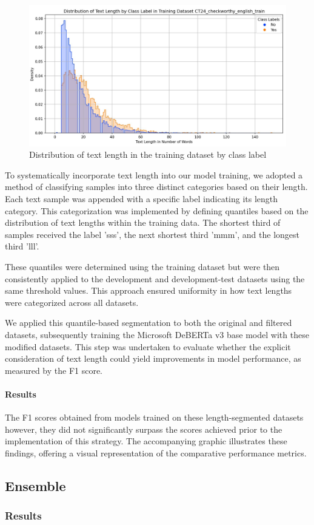 \begin{figure}[h]
    \centering
    \includegraphics[width=1\textwidth]{assets/Text_Length.jpg}
    \caption{Distribution of text length in the training dataset by class label}
    \label{fig:my_label}
\end{figure}
To systematically incorporate text length into our model training, we adopted a method of classifying samples into three distinct categories based on their length. Each text sample was appended with a specific label indicating its length category. This categorization was implemented by defining quantiles based on the distribution of text lengths within the training data. The shortest third of samples received the label 'sss', the next shortest third 'mmm', and the longest third 'lll'.

These quantiles were determined using the training dataset but were then consistently applied to the development and development-test datasets using the same threshold values. This approach ensured uniformity in how text lengths were categorized across all datasets.

We applied this quantile-based segmentation to both the original and filtered datasets, subsequently training the Microsoft DeBERTa v3 base model with these modified datasets. This step was undertaken to evaluate whether the explicit consideration of text length could yield improvements in model performance, as measured by the F1 score.

\paragraph{Results}
The F1 scores obtained from models trained on these length-segmented datasets however, they did not significantly surpass the scores achieved prior to the implementation of this strategy. The accompanying graphic illustrates these findings, offering a visual representation of the comparative performance metrics.

\newpage
\subsection{Ensemble}
\subsubsection{Results}